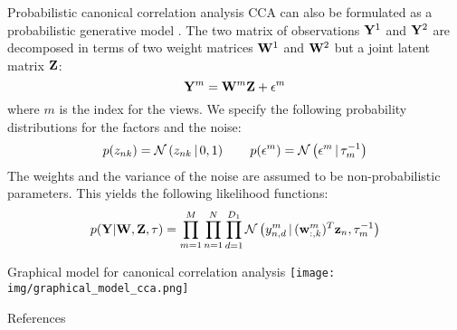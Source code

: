 \documentclass[aspectratio=169,notes]{beamer}
\begin{document}
	\begin{frame}{Probabilistic canonical correlation analysis}
	CCA can also be formulated as a probabilistic generative model \cite{Bach2005}. The two matrix of observations ${\bf Y}^{1}$ and ${\bf Y}^{2}$ are decomposed in terms of two weight matrices ${\bf W}^{1}$ and ${\bf W}^{2}$ but a joint latent matrix ${\bf Z}$:
	\begin{equation}
		{\bf Y}^{m} = {\bf W}^{m} {\bf Z} + \epsilon^{m}
	\end{equation}
	where $m$ is the index for the views. We specify the following probability distributions for the factors and the noise:
	\begin{align*}
		p(z_{nk}) = \mathcal{N}\left(z_{nk} \,|\, 0,1\right) \qquad
		p(\epsilon^{m}) = \mathcal{N}\left(\epsilon^{m} \,|\, \tau_{m}^{-1}\right)
	\end{align*}
	The weights and the variance of the noise are assumed to be non-probabilistic parameters. This yields the following likelihood functions:
	\begin{equation}
		p({\bf Y}|{\bf W},{\bf Z},\tau) = \prod_{m=1}^{M} \prod_{n=1}^{N} \prod_{d=1}^{D_1} \mathcal{N}\left(y^{m}_{n,d} \,|\, ({\bf w}_{:,k}^{m})^T {\bf z}_{n},\tau_{m}^{-1}\right)
	\end{equation}
	\end{frame}

	\begin{frame}{Graphical model for canonical correlation analysis}
	\centering
	\texttt{[image: img/graphical\_model\_cca.png]}
	\end{frame}



	
	\begin{frame}{References}
  	\printbibliography
	\end{frame}
\end{document}
